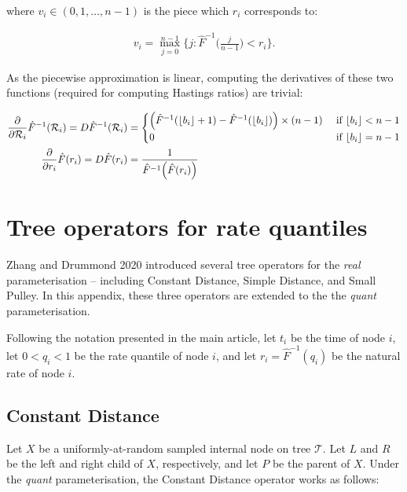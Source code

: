 \documentclass[12pt]{article}
\DeclarePairedDelimiter\floor{\lfloor}{\rfloor}
\begin{document}
where $v_i \in (0, 1, \dotso, n-1)$ is the piece which $r_i$ corresponds to:


\begin{align}
v_i = \max\limits_{j = 0}^{n-1} \{ j : \hat{F}^{-1}\big(\frac{j}{n-1}\big) < r_i \}.
\end{align}


As the piecewise approximation is linear, computing the derivatives of these two functions (required for computing Hastings ratios) are trivial:


\begin{align}
\frac{\partial}{\partial \mathcal{R}_i} \hat{F}^{-1}(\mathcal{R}_i) =  D \hat{F}^{-1}(\mathcal{R}_i) &= \begin{cases}  \Big(\hat{F}^{-1}(\floor{b_i}+1) - \hat{F}^{-1}(\floor{b_i})\Big) \times(n-1)  & \text{ if } \floor{b_i} < n-1 \\
0 & \text{ if } \floor{b_i} = n-1 \end{cases} \label{eqn:derivFinv}  \\
\frac{\partial}{\partial r_i} \hat{F}(r_i) = D \hat{F}(r_i) &= \frac{1}{\hat{F}^{-1}\Big(\hat{F}(r_i)\Big)} \label{eqn:derivF}
\end{align}





\section{Tree operators for rate quantiles}

Zhang and Drummond 2020 introduced several tree operators for the \textit{real} parameterisation -- including Constant Distance, Simple Distance, and Small Pulley. In this appendix, these three operators are extended to the  the \textit{quant} parameterisation.

Following the notation presented in the main article, let $t_i$ be the time of node $i$, let $0 < q_i < 1$ be the rate quantile of node $i$, and let $r_i = \hat{F}^{-1}(q_i)$ be the natural rate of node $i$.








\subsection{Constant Distance}



Let $X$ be a uniformly-at-random sampled internal node on tree $\mathcal{T}$. Let $L$ and $R$ be the left and right child of $X$, respectively, and let $P$ be the parent of $X$. Under the \textit{quant} parameterisation, the Constant Distance operator works as follows: \\
\end{document}
